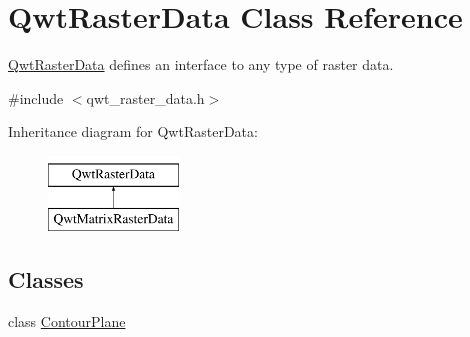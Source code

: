 \hypertarget{class_qwt_raster_data}{\section{Qwt\-Raster\-Data Class Reference}
\label{class_qwt_raster_data}
}


\hyperlink{class_qwt_raster_data}{Qwt\-Raster\-Data} defines an interface to any type of raster data.  




{\ttfamily \#include $<$qwt\-\_\-raster\-\_\-data.\-h$>$}

Inheritance diagram for Qwt\-Raster\-Data\-:\begin{figure}[H]
\begin{center}
\leavevmode
\includegraphics[height=2.000000cm]{class_qwt_raster_data}
\end{center}
\end{figure}
\subsection*{Classes}
\begin{DoxyCompactItemize}
\item 
class \hyperlink{class_qwt_raster_data_1_1_contour_plane}{Contour\-Plane}
\end{DoxyCompactItemize}
